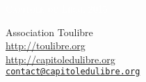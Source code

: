\documentclass{cdl_sponsor}
\begin{document}
\renewcommand{\tablename}{\bsc{Tableau}}

\thispagestyle{empty} %



\parbox[t]{1.0\textwidth}{
	\flushright \fontsize{45pt}{60pt}\selectfont %
	\vspace*{0.7cm} %
		
	\textcolor{white}{
		\hfill \textsc{Capitole du Libre 2015} \\
		\fontsize{36pt}{50pt}
	}
	\par
	
	\vspace*{0.7cm} %
}




\vfill %

{\centering \large 
\hfill Association Toulibre \\
\hfill \url{http://toulibre.org} \\
\hfill \url{http://capitoledulibre.org} \\
\hfill \href{mailto:contact@capitoledulibre.org}{\texttt{contact@capitoledulibre.org}} \\
}
\clearpage
\end{document}
